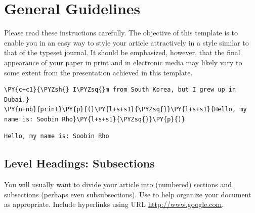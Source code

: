 \section*{General Guidelines}
\noindent Please read these instructions carefully.   The objective of this template is to enable you in an easy way to style your article attractively in a style similar to that of the typeset journal. It should be emphasized, however, that the final appearance of your paper in print and in electronic media may likely vary to some extent from the presentation achieved in this template.

    \begin{tcolorbox}[breakable, size=fbox, boxrule=1pt, pad at break*=1mm,colback=cellbackground, colframe=cellborder]
\begin{Verbatim}[commandchars=\\\{\}]
\PY{c+c1}{\PYZsh{} I\PYZsq{}m from South Korea, but I grew up in Dubai.}
\PY{n+nb}{print}\PY{p}{(}\PY{l+s+s1}{\PYZsq{}}\PY{l+s+s1}{Hello, my name is: Soobin Rho}\PY{l+s+s1}{\PYZsq{}}\PY{p}{)}
\end{Verbatim}
\end{tcolorbox}

    \begin{Verbatim}[commandchars=\\\{\}]
Hello, my name is: Soobin Rho
    \end{Verbatim}



    
\subsection*{Level Headings: Subsections}
\noindent You will usually want to divide your article into (numbered) sections and subsections (perhaps even subsubsections).  Use to help organize your document as appropriate. Include hyperlinks using  URL \url{http://www.google.com}.  


